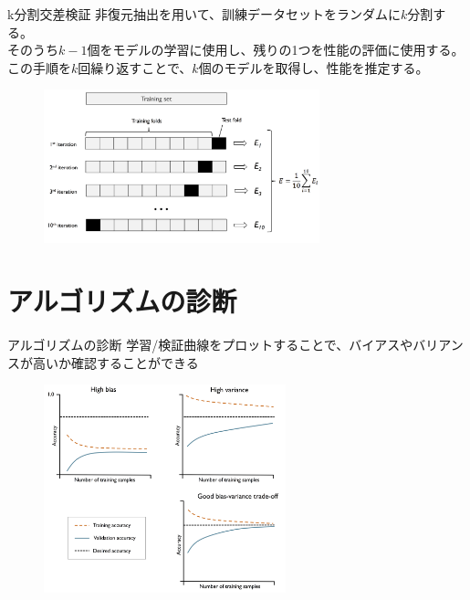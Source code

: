 \documentclass[aspectratio=169, dvipdfmx, 11pt]{beamer} %
\begin{document}
\begin{frame}{k分割交差検証}
    非復元抽出を用いて、訓練データセットをランダムに\(k\)分割する。\\
    そのうち\(k-1\)個をモデルの学習に使用し、残りの1つを性能の評価に使用する。\\
    この手順を\(k\)回繰り返すことで、\(k\)個のモデルを取得し、性能を推定する。\\
    \vspace{1em}
    \begin{figure}[b]
        \begin{center}
        \includegraphics[width=80mm]{img/day06/fig02.png}
        \end{center}
    \end{figure}
\end{frame}

\section{アルゴリズムの診断}
\begin{frame}{アルゴリズムの診断}
    学習/検証曲線をプロットすることで、バイアスやバリアンスが高いか確認することができる
    \vspace{1em}
    \begin{figure}[b]
        \begin{center}
        \includegraphics[width=70mm]{img/day06/fig03.png}
        \end{center}
    \end{figure}
\end{frame}
\end{document}

